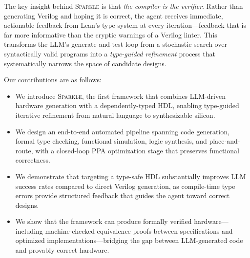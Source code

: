 The key insight behind \textsc{Sparkle} is that \emph{the compiler is the verifier}. Rather than generating Verilog and hoping it is correct, the agent receives immediate, actionable feedback from Lean's type system at every iteration---feedback that is far more informative than the cryptic warnings of a Verilog linter. This transforms the LLM's generate-and-test loop from a stochastic search over syntactically valid programs into a \emph{type-guided refinement} process that systematically narrows the space of candidate designs.

Our contributions are as follows:
\begin{itemize}[leftmargin=*,itemsep=2pt,topsep=3pt]
    \item We introduce \textsc{Sparkle}, the first framework that combines LLM-driven hardware generation with a dependently-typed HDL, enabling type-guided iterative refinement from natural language to synthesizable silicon.
    \item We design an end-to-end automated pipeline spanning code generation, formal type checking, functional simulation, logic synthesis, and place-and-route, with a closed-loop PPA optimization stage that preserves functional correctness.
    \item We demonstrate that targeting a type-safe HDL substantially improves LLM success rates compared to direct Verilog generation, as compile-time type errors provide structured feedback that guides the agent toward correct designs.
    \item We show that the framework can produce formally verified hardware---including machine-checked equivalence proofs between specifications and optimized implementations---bridging the gap between LLM-generated code and provably correct hardware.
\end{itemize}
